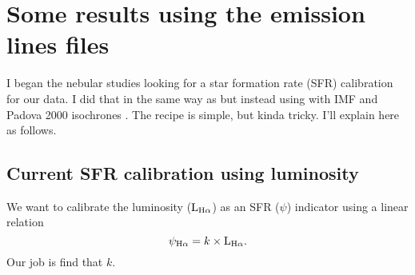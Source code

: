 \documentclass[a4paper,11pt]{article}
\begin{document}
\section{Some results using the emission lines files}

I began the nebular studies looking for a star formation rate (SFR) calibration for our data. I did
that in the same way as \citet[sec. 5.1]{Asari.etal.2007a} but instead using \citet{BC03a} with
\citet{Salpeter.1955a} IMF and Padova 2000 isochrones \citep{Girardi.etal.2000a}. The recipe is
simple, but kinda tricky. I'll explain here as follows.

\subsection{Current SFR calibration using \Halpha luminosity}
\label{sub:NebularSFR}
We want to calibrate the \Halpha luminosity ($\mathrm{L}_{\Halpha}$) as an SFR ($\psi$) indicator
\citep[e.g., ][]{Kennicutt.1998a} using a linear relation
\begin{equation}
	\psi_{\Halpha} = k \times \mathrm{L}_{\Halpha}.
	\label{eq:SFRHa}
\end{equation}
\noindent Our job is find that $k$.
\end{document}
